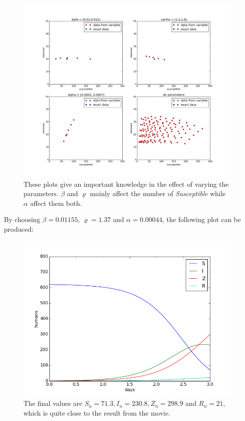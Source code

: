 \documentclass[%
twoside,                 %
final,                   %
10pt]{article}
\begin{document}
\begin{figure}[ht]
  \centerline{\includegraphics[width=0.9\linewidth]{plots/check_parameters.png}}
  \caption{
  These plots give an important knowledge in the effect of varying the parameters. $\beta$ and $\varrho$ mainly affect the number of \emph{Susceptible} while $\alpha$ affect them both.
  }
\end{figure}


By choosing $\beta = 0.01155$, $\varrho=1.37$ and $\alpha=0.00044$, the following plot can be produced:  


\begin{figure}[ht]
  \centerline{\includegraphics[width=0.9\linewidth]{plots/WD_zombie_initial_2.png}}
  \caption{
  The final values are $S_n=71.3,I_n=230.8,Z_n=298.9$ and $R_n=21$, which is quite close to the result from the movie.
  }
\end{figure}
\end{document}
